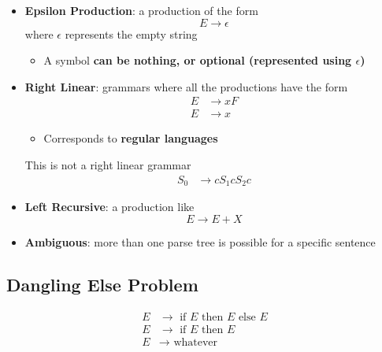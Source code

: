   \begin{itemize}
    \item \textbf{Epsilon Production}: a production of the form
    \begin{equation*}
      E \to \epsilon
    \end{equation*}
    where $ \epsilon $ represents the empty string

    \begin{itemize}
      \item A symbol \textbf{can be nothing, or optional (represented using
      $ \epsilon $)}
    \end{itemize}

    \item \textbf{Right Linear}: grammars where all the productions have the
    form
    \begin{align*}
      E &\to x F \\
      E &\to x
    \end{align*}

    \begin{itemize}
      \item Corresponds to \textbf{regular languages}
    \end{itemize}

    This is not a right linear grammar
    \begin{align*}
      S_{0} &\to c S_{1} c S_{2} c
    \end{align*}

    \item \textbf{Left Recursive}: a production like
    \begin{equation*}
      E \to E + X
    \end{equation*}

    \item \textbf{Ambiguous}: more than one parse tree is possible for a
    specific sentence
  \end{itemize}

  \subsection{Dangling Else Problem}

    \begin{align*}
      E &\to \text{ if } E \text{ then } E \text{ else } E \\
      E &\to \text{ if } E \text{ then } E \\
      E &\to \text{ whatever}
    \end{align*}

